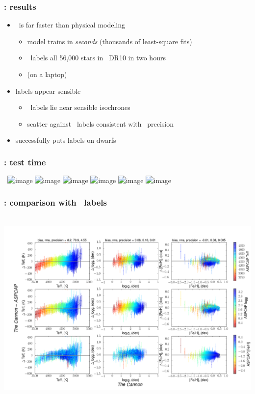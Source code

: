 \documentclass[pdftex]{beamer}
\begin{document}
\newcommand{\results}{%
\begin{frame}
  \frametitle{\tc: results}
  \begin{itemize}
  \item \tc\ is far faster than physical modeling
    \begin{itemize}
    \item model trains in \emph{seconds} (thousands of least-square fits)
    \item \tc\ labels all 56,000 stars in \apogee\ DR10 in two hours
    \item (on a laptop)
    \end{itemize}
  \item labels appear sensible
    \begin{itemize}
    \item \tc\ labels lie near sensible isochrones
    \item scatter against \apogee\ labels consistent with \apogee\ precision
    \end{itemize}
  \item successfully puts labels on dwarfs
  \end{itemize}
\end{frame}}

\results

\begin{frame}
  \frametitle{\tc: test time}
  ~\hfill\includegraphics<1>[height=\figureheight]{../documents/plots/4431_v19.png}
         \includegraphics<2>[height=\figureheight]{../documents/plots/4383_v19.png}
         \includegraphics<3>[height=\figureheight]{../documents/plots/4399_v19.png}
         \includegraphics<4>[height=\figureheight]{../documents/plots/4309_v19.png}
         \includegraphics<5>[height=\figureheight]{../documents/plots/4311_v19.png}
         \includegraphics<6>[height=\figureheight]{../documents/plots/4255_v19.png} 
\end{frame}

\begin{frame}
  \frametitle{\tc: comparison with \apogee\ labels}
  ~\hfill\includegraphics[height=\figureheight]{../documents/plots/cplot2.png} 
\end{frame}
\end{document}
